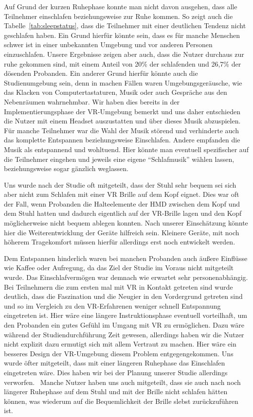 Auf Grund der kurzen Ruhephase konnte man nicht davon ausgehen, dass alle Teilnehmer einschlafen beziehungsweise zur Ruhe kommen. So zeigt auch die Tabelle~\ref{tab:sleepstatus}, dass die Teilnehmer mit einer deutlichen Tendenz nicht geschlafen haben. 
Ein Grund hierfür könnte sein, dass es für manche Menschen schwer ist in einer unbekannten Umgebung und vor anderen Personen einzuschlafen. Unsere Ergebnisse zeigen aber auch, dass die Nutzer durchaus zur ruhe gekommen sind, mit einem Anteil von 20\% der schlafenden und 26,7\% der dösenden Probanden. 
Ein anderer Grund hierfür könnte auch die Studienumgebung sein, denn in machen Fällen waren Umgebungsgeräusche, wie das Klacken von Computertastaturen, Musik oder auch Gespräche aus den Nebenräumen wahrnehmbar. Wir haben dies bereits in der Implementierungsphase der VR-Umgebung bemerkt und uns daher entschieden die Nutzer mit einem Headset auszustatten und über dieses Musik abzuspielen.
Für manche Teilnehmer war die Wahl der Musik störend und verhinderte auch das komplette Entspannen beziehungsweise Einschlafen. 
Andere empfanden die Musik als entspannend und wohltuend. 
Hier könnte man eventuell spezifischer auf die Teilnehmer eingehen und jeweils eine eigene "`Schlafmusik"' wählen lassen, beziehungsweise sogar gänzlich weglassen.

Uns wurde nach der Studie oft mitgeteilt, dass der Stuhl sehr bequem sei sich aber nicht zum Schlafen mit einer VR Brille auf dem Kopf eignet. 
Dies war oft der Fall, wenn Probanden die Halteelemente der HMD zwischen dem Kopf und dem Stuhl hatten und dadurch eigentlich auf der VR-Brille lagen und den Kopf möglicherweise nicht bequem ablegen konnten. 
Nach unserer Einschätzung könnte hier die Weiterentwicklung der Geräte hilfreich sein. Kleinere Geräte, mit noch höherem Tragekomfort müssen hierfür allerdings erst noch entwickelt werden.

Dem Entspannen hinderlich waren bei manchen Probanden auch äußere Einflüsse wie Kaffee oder Aufregung, da das Ziel der Studie im Voraus nicht mitgeteilt wurde. Das Einschlafvermögen war demnach wie erwartet sehr personenabhängig.
Bei Teilnehmern die zum ersten mal mit VR in Kontakt getreten sind wurde deutlich, dass die Faszination und die Neugier in den Vordergrund getreten sind und so im Vergleich zu den VR-Erfahrenen weniger schnell Entspannung eingetreten ist. 
Hier wäre eine längere Instruktionsphase eventuell vorteilhaft, um den Probanden ein gutes Gefühl im Umgang mit VR zu ermöglichen. 
Dazu wäre während der Studiendurchführung Zeit gewesen, allerdings haben wir die Nutzer nicht explizit dazu ermutigt sich mit allem Vertraut zu machen. Hier wäre ein besseres Design der VR-Umgebung diesem Problem entgegengekommen.
Uns wurde öfter mitgeteilt, dass mit einer längeren Ruhephase das Einschlafen eingetreten wäre. Dies haben wir bei der Planung unserer Studie allerdings verworfen.~
Manche Nutzer haben uns auch mitgeteilt, dass sie auch nach noch längerer Ruhephase auf dem Stuhl und mit der Brille nicht schlafen hätten können, was wiederum auf die Bequemlichkeit der Brille slebst zurückzuführen ist.

